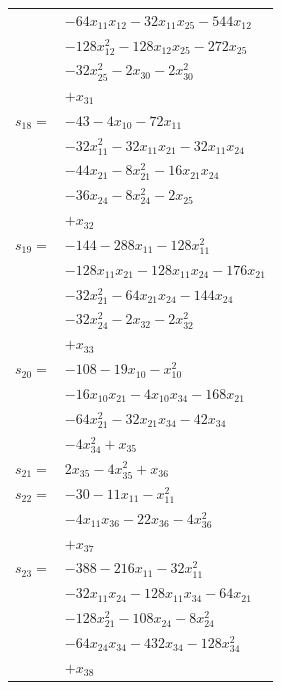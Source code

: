\begin{longtable}{@{}r@{\;}l@{}}
 & \(\displaystyle -64x_{11}x_{12} -32x_{11}x_{25} -544x_{12}\) \\
 & \(\displaystyle -128x_{12}^{2} -128x_{12}x_{25} -272x_{25}\) \\
 & \(\displaystyle -32x_{25}^{2} -2x_{30} -2x_{30}^{2}\) \\
 & \(\displaystyle +x_{31}\) \\[3pt]
\(s_{18}=\) & \(\displaystyle -43 -4x_{10} -72x_{11}\) \\
 & \(\displaystyle -32x_{11}^{2} -32x_{11}x_{21} -32x_{11}x_{24}\) \\
 & \(\displaystyle -44x_{21} -8x_{21}^{2} -16x_{21}x_{24}\) \\
 & \(\displaystyle -36x_{24} -8x_{24}^{2} -2x_{25}\) \\
 & \(\displaystyle +x_{32}\) \\[3pt]
\(s_{19}=\) & \(\displaystyle -144 -288x_{11} -128x_{11}^{2}\) \\
 & \(\displaystyle -128x_{11}x_{21} -128x_{11}x_{24} -176x_{21}\) \\
 & \(\displaystyle -32x_{21}^{2} -64x_{21}x_{24} -144x_{24}\) \\
 & \(\displaystyle -32x_{24}^{2} -2x_{32} -2x_{32}^{2}\) \\
 & \(\displaystyle +x_{33}\) \\[3pt]
\(s_{20}=\) & \(\displaystyle -108 -19x_{10} -x_{10}^{2}\) \\
 & \(\displaystyle -16x_{10}x_{21} -4x_{10}x_{34} -168x_{21}\) \\
 & \(\displaystyle -64x_{21}^{2} -32x_{21}x_{34} -42x_{34}\) \\
 & \(\displaystyle -4x_{34}^{2} +x_{35}\) \\[3pt]
\(s_{21}=\) & \(\displaystyle 2x_{35} -4x_{35}^{2} +x_{36}\) \\[3pt]
\(s_{22}=\) & \(\displaystyle -30 -11x_{11} -x_{11}^{2}\) \\
 & \(\displaystyle -4x_{11}x_{36} -22x_{36} -4x_{36}^{2}\) \\
 & \(\displaystyle +x_{37}\) \\[3pt]
\(s_{23}=\) & \(\displaystyle -388 -216x_{11} -32x_{11}^{2}\) \\
 & \(\displaystyle -32x_{11}x_{24} -128x_{11}x_{34} -64x_{21}\) \\
 & \(\displaystyle -128x_{21}^{2} -108x_{24} -8x_{24}^{2}\) \\
 & \(\displaystyle -64x_{24}x_{34} -432x_{34} -128x_{34}^{2}\) \\
 & \(\displaystyle +x_{38}\) \\[3pt]

\end{longtable}
